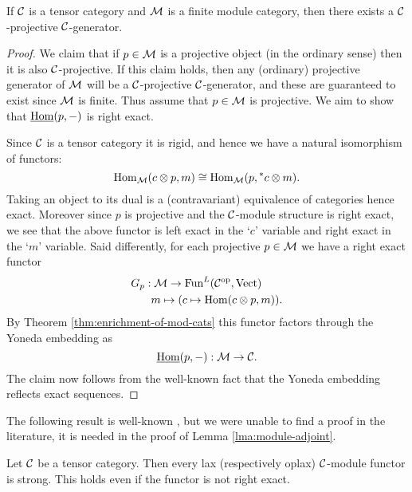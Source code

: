\documentclass{amsart}
\begin{document}
\begin{lemma} \label{lma:Enough_C-projs}
	If $\mathcal C$ is a tensor category and $\mathcal M$ is a finite module category, then there exists a $\mathcal C$-projective $\mathcal C$-generator. 
\end{lemma} 

\begin{proof}
	We claim that if $p \in \mathcal M$ is a projective object (in the ordinary sense) then it is also $\mathcal C$-projective. If this claim holds, then any (ordinary) projective generator of $\mathcal M$ will be a $\mathcal C$-projective $\mathcal C$-generator, and these are guaranteed to exist since $\mathcal M$ is finite. Thus assume that $p \in \mathcal M$ is projective.  We aim to show that $\operatorname{\underline{Hom}}(p, -)$ is right exact. 
	
	Since $\mathcal C$ is a tensor category it is rigid, and hence we have a natural isomorphism of functors:
\begin{equation*}
	\operatorname{Hom}_{\mathcal M}(c \otimes p, m) \cong \operatorname{Hom}_{\mathcal M}(p, {}^*c \otimes m).
\end{equation*}
Taking an object to its dual is a (contravariant) equivalence of categories hence exact. Moreover since $p$ is projective and the $\mathcal C$-module structure is right exact, we see that the above functor is left exact in the `$c$' variable and right exact in the `$m$' variable. Said differently, for each projective $p \in \mathcal M$ we have a right exact functor
\begin{align*}
	G_p: & \; \mathcal M \to \operatorname{Fun}^L(\mathcal C^{\mathrm{op}}, \mathrm{Vect}) \\
	& m \mapsto (c \mapsto \operatorname{Hom}(c \otimes p, m)).
\end{align*}
By Theorem \ref{thm:enrichment-of-mod-cats} this functor factors through the Yoneda embedding as
\begin{equation*}
	\operatorname{\underline{Hom}}(p, -): \mathcal M \to \mathcal C.
\end{equation*}
The claim now follows from the well-known fact that the Yoneda embedding reflects exact sequences. 
\end{proof}


The following result is well-known \cite[Rmk 4]{MR1976459}, but we were unable to find a proof in the literature, it is needed in the proof of Lemma  \ref{lma:module-adjoint}.

\begin{lemma} \label{lem:laxisstrong}
	Let $\mathcal C$ be a tensor category. Then every lax (respectively oplax) $\mathcal C$-module functor is strong. This holds even if the functor is not right exact.   
\end{lemma} 
\end{document}
